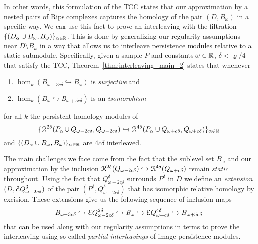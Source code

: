 In other words, this formulation of the TCC states that our approximation by a nested pairs of Rips complexes captures the homology of the pair $(D,B_\omega)$ in a specific way.
We can use this fact to prove an interleaving with the filtration $\{(D_\alpha\cup B_\omega, B_\omega)\}_{\alpha\in\mathbb{R}}$.
This is done by generalizing our regularity assumptions near $D\setminus B_\omega$ in a way that allows us to interleave persistence modules relative to a static submodule.
Specifically, given a sample $P$ and constants $\omega\in\mathbb{R}$, $\delta < \varrho/4$ that satisfy the TCC, Theorem~\ref{thm:interleaving_main_2} states that whenever
\begin{enumerate}
  \item $\hom_k(B_{\omega-3c\delta}\hookrightarrow B_\omega)$ is \emph{surjective} and
  \item $\hom_k(B_\omega\hookrightarrow B_{\omega+5c\delta})$ is an \emph{isomorphism}
\end{enumerate}
for all $k$ the persistent homology modules of
\[ \{\mathcal{R}^{2\delta}(P_\alpha\cup Q_{\omega-2c\delta}, Q_{\omega-2c\delta})\hookrightarrow \mathcal{R}^{4\delta}(P_\alpha\cup Q_{\omega+c\delta}, Q_{\omega+c\delta})\}_{\alpha\in\mathbb{R}}\]
and $\{(D_\alpha\cup B_\omega, B_\omega)\}_{\alpha\in\mathbb{R}}$ are $4c\delta$ interleaved.

The main challenges we face come from the fact that the sublevel set $B_\omega$ and our approximation by the inclusion $\mathcal{R}^{2\delta}(Q_{\omega-2c\delta})\hookrightarrow \mathcal{R}^{4\delta}(Q_{\omega+c\delta})$ remain \emph{static} throughout.
Using the fact that $Q_{\omega-2c\delta}^\delta$ surrounds $P^\delta$ in $D$ we define an \emph{extension} $(D,\mathcal{E} Q_{\omega-2c\delta}^\delta)$ of the pair $(P^\delta, Q_{\omega-2c\delta}^\delta)$ that has isomorphic relative homology by excision.
These extensions give us the following sequence of inclusion maps
\[ B_{\omega-3c\delta}\hookrightarrow \mathcal{E} Q_{\omega-2c\delta}^{2\delta}\hookrightarrow B_\omega\hookrightarrow \mathcal{E} Q_{\omega+c\delta}^{4\delta}\hookrightarrow B_{\omega+5c\delta}\]
that can be used along with our regularity assumptions in terms to prove the interleaving using so-called \emph{partial interleavings} of image persistence modules.

